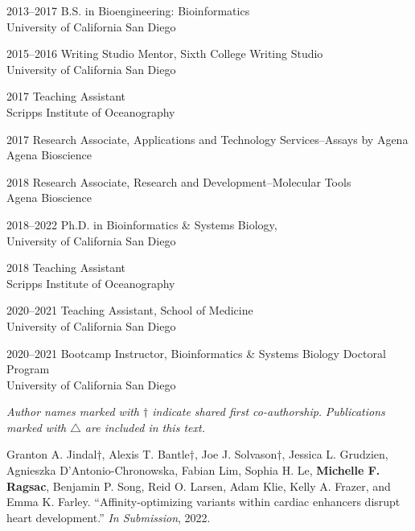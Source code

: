 \documentclass[11pt]{formatting-template}
\begin{document}
\begin{vita}
\noindent
\begin{cv}{}
\begin{cvlist}{}
	\item[2013--2017] B.S. in Bioengineering: Bioinformatics\\
		University of California San Diego
	\item[2015--2016] Writing Studio Mentor, Sixth College Writing Studio\\
		University of California San Diego
	\item[2017] Teaching Assistant\\Scripps Institute of Oceanography 
	\item[2017] Research Associate, Applications and Technology Services--Assays by Agena\\
		Agena Bioscience
	\item[2018] Research Associate, Research and Development--Molecular Tools\\
		Agena Bioscience 
	\item[2018--2022] Ph.D. in Bioinformatics \& Systems Biology,\\
		University of California San Diego
	\item[2018] Teaching Assistant\\
		Scripps Institute of Oceanography
	\item[2020--2021] Teaching Assistant, School of Medicine\\
		University of California San Diego 
	\item[2020--2021] Bootcamp Instructor, Bioinformatics \& Systems Biology Doctoral Program\\
		University of California San Diego 
\end{cvlist}
\end{cv}

\publications{}

\noindent \textit{Author names marked with $\dagger$ indicate shared first co-authorship.} \newline
\noindent \textit{Publications marked with $\triangle$ are included in this text.} \newline

\noindent Granton A. Jindal$\dagger$, Alexis T. Bantle$\dagger$, Joe J. Solvason$\dagger$, Jessica L. Grudzien, Agnieszka D'Antonio-Chronowska, Fabian Lim, Sophia H. Le, \textbf{Michelle F. Ragsac}, Benjamin P. Song, Reid O. Larsen, Adam Klie, Kelly A. Frazer, and Emma K. Farley. ``Affinity-optimizing variants within cardiac enhancers disrupt heart development.'' \textit{In Submission}, 2022. \newline


\end{vita}
\end{document}
